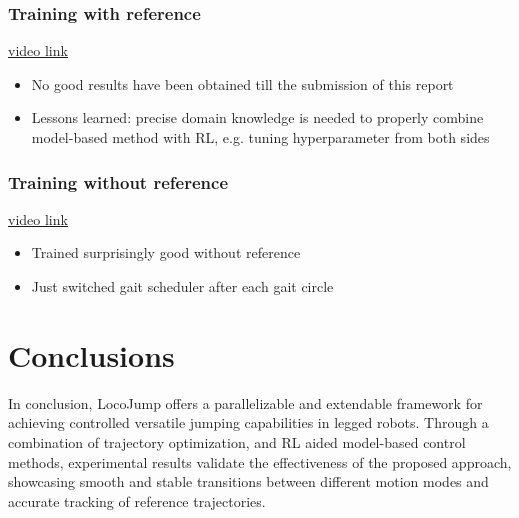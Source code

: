 \documentclass[11pt, conference]{IEEEtran}
\theoremstyle{definition} %
\begin{document}
\subsubsection{Training with reference}
\href{https://drive.google.com/file/d/1pSJmZ-tl52aZ7GZI2nzOxkKTZGH0hfcQ/view?usp=drive_link}{video link}
\begin{itemize}
    \item No good results have been obtained till the submission of this report
    \item Lessons learned: precise domain knowledge is needed to properly combine model-based method with RL, e.g. tuning hyperparameter from both sides
\end{itemize}

\subsubsection{Training without reference}
\href{https://drive.google.com/file/d/1G1joUFXv9Kfyl7xER_ZQAMzWuTytkTiu/view?usp=drive_link}{video link}
\begin{itemize}
    \item Trained surprisingly good without reference
    \item Just switched gait scheduler after each gait circle
\end{itemize}

\section{Conclusions}
In conclusion, LocoJump offers a parallelizable and extendable framework for achieving controlled versatile jumping capabilities in legged robots. Through a combination of trajectory optimization, and RL aided model-based control methods, experimental results validate the effectiveness of the proposed approach, showcasing smooth and stable transitions between different motion modes and accurate tracking of reference trajectories.




\FloatBarrier


\end{document}
